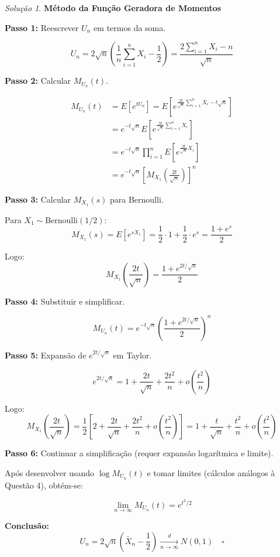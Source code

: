 \documentclass[12pt,a4paper]{article}
\theoremstyle{definition}
\theoremstyle{remark}
\newtheorem{solucao}{Solução}[section]
\begin{document}
\begin{solucao}
\textbf{Método da Função Geradora de Momentos}

\textbf{Passo 1:} Reescrever $U_n$ em termos da soma.

\[
U_n = 2 \sqrt{n} \left( \frac{1}{n}\sum_{i=1}^n X_i - \frac{1}{2} \right) = \frac{2 \sum_{i=1}^n X_i - n}{\sqrt{n}}
\]

\textbf{Passo 2:} Calcular $M_{U_n}(t)$.

\begin{align}
M_{U_n}(t) &= E\left[ e^{t U_n} \right] = E\left[ e^{\frac{2t}{\sqrt{n}} \sum_{i=1}^n X_i - t \sqrt{n}} \right] \\
&= e^{-t \sqrt{n}} E\left[ e^{\frac{2t}{\sqrt{n}} \sum_{i=1}^n X_i} \right] \\
&= e^{-t \sqrt{n}} \prod_{i=1}^n E\left[ e^{\frac{2t}{\sqrt{n}} X_i} \right] \\
&= e^{-t \sqrt{n}} \left[ M_{X_1}\left(\frac{2t}{\sqrt{n}}\right) \right]^n
\end{align}

\textbf{Passo 3:} Calcular $M_{X_1}(s)$ para Bernoulli.

Para $X_1 \sim \text{Bernoulli}(1/2)$:
\[
M_{X_1}(s) = E[e^{sX_1}] = \frac{1}{2} \cdot 1 + \frac{1}{2} \cdot e^s = \frac{1 + e^s}{2}
\]

Logo:
\[
M_{X_1}\left(\frac{2t}{\sqrt{n}}\right) = \frac{1 + e^{2t/\sqrt{n}}}{2}
\]

\textbf{Passo 4:} Substituir e simplificar.

\[
M_{U_n}(t) = e^{-t \sqrt{n}} \left( \frac{1 + e^{2t/\sqrt{n}}}{2} \right)^n
\]

\textbf{Passo 5:} Expansão de $e^{2t/\sqrt{n}}$ em Taylor.

\[
e^{2t/\sqrt{n}} = 1 + \frac{2t}{\sqrt{n}} + \frac{2t^2}{n} + o\left(\frac{t^2}{n}\right)
\]

Logo:
\[
M_{X_1}\left(\frac{2t}{\sqrt{n}}\right) = \frac{1}{2}\left[2 + \frac{2t}{\sqrt{n}} + \frac{2t^2}{n} + o\left(\frac{t^2}{n}\right)\right] = 1 + \frac{t}{\sqrt{n}} + \frac{t^2}{n} + o\left(\frac{t^2}{n}\right)
\]

\textbf{Passo 6:} Continuar a simplificação (requer expansão logarítmica e limite).

Após desenvolver usando $\log M_{U_n}(t)$ e tomar limites (cálculos análogos à Questão 4), obtém-se:

\[
\lim_{n \to \infty} M_{U_n}(t) = e^{t^2/2}
\]

\textbf{Conclusão:}
\[
U_n = 2\sqrt{n}\left(\bar{X}_n - \frac{1}{2}\right) \xrightarrow[n \to \infty]{d} N(0,1) \quad \square
\]
\end{solucao}
\end{document}
